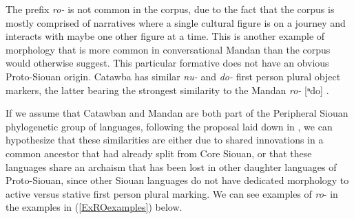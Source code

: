 \label{Para1PLS}

The prefix \textit{ro-} is not common in the corpus, due to the fact that the corpus is mostly comprised of narratives where a single cultural figure is on a journey and interacts with maybe one other figure at a time. This is another example of morphology that is more common in conversational Mandan than the corpus would otherwise suggest. This particular formative does not have an obvious Proto-Siouan origin. Catawba has similar \textit{nu-} and \textit{do-} first person plural object markers, the latter bearing the strongest similarity to the Mandan \textit{ro-} [ⁿdo] \citep{rankin2015}. 

If we assume that Catawban and Mandan are both part of the Peripheral Siouan phylogenetic group of languages, following the proposal laid down in \citet{kasak2015}, we can hypothesize that these similarities are either due to shared innovations in a common ancestor that had already split from Core Siouan, or that these languages share an archaism that has been lost in other daughter languages of Proto-Siouan, since other Siouan languages do not have dedicated morphology to active versus stative first person plural marking. We can see examples of \textit{ro}- in the examples in (\ref{ExROexamples}) below.

